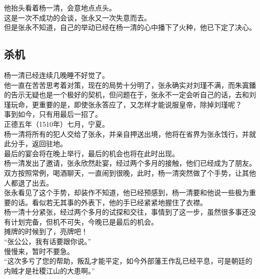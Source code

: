 \begin{multicols}{\theparacolNo}
他抬头看着杨一清，会意地点点头。\\

这是一次不成功的会谈，张永又一次失意而去。\\

但是张永不知道，自己的举动已经在杨一清的心中播下了火种，他已下定了决心。\\

\subsection{杀机}
杨一清已经连续几晚睡不好觉了。\\

他一直在苦苦思考着对策，现在的局势十分明了，张永确实对刘瑾不满，而朱寘鐇的告示无疑也是一个极好的契机，但问题在于，张永不一定会听自己的话，去和刘瑾玩命，更重要的是，即使张永答应了，又怎样才能说服皇帝，除掉刘瑾呢？\\

事到如今，只有用最后一招了。\\

正德五年（1510年）七月，宁夏。\\

杨一清将所有的犯人交给了张永，并亲自押送出境，他将在省界为张永饯行，并就此分手，返回驻地。\\

最后的宴会将在晚上举行，最后的机会也将在此时出现。\\

杨一清发出了邀请，张永欣然赴宴，经过两个多月的接触，他们已经成为了朋友。\\

双方按照常例，喝酒聊天，一直闹到很晚，此时，杨一清突然做了个手势，让其他人都退了出去。\\

张永看见了这个手势，却装作不知道，他已经预感到，杨一清要和他说一些极为重要的话。看似若无其事的外表下，他的手已经紧紧地握住了衣襟。\\

杨一清十分紧张，经过两个多月的试探和交往，事情到了这一步，虽然很多事还没有计划完备，但机不可失，今晚已是最后的机会。\\

摊牌的时候到了，亮牌吧！\\

“张公公，我有话要跟你说。”\\

慢慢来，暂时不要急。\\

“这次多亏了您的帮助，叛乱才能平定，如今外部藩王作乱已经平息，可是朝廷的内贼才是社稷江山的大患啊。”\\


\end{multicols}
